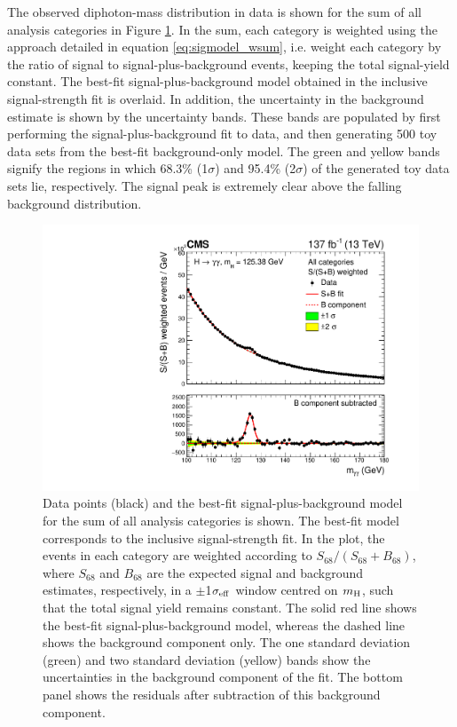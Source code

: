 The observed diphoton-mass distribution in data is shown for the sum of all analysis categories in Figure \ref{fig:sb_inclusive}. In the sum, each category is weighted using the approach detailed in equation \ref{eq:sigmodel_wsum}, i.e. weight each category by the ratio of signal to signal-plus-background events, keeping the total signal-yield constant. The best-fit signal-plus-background model obtained in the inclusive signal-strength fit is overlaid. In addition, the uncertainty in the background estimate is shown by the uncertainty bands. These bands are populated by first performing the signal-plus-background fit to data, and then generating 500 toy data sets from the best-fit background-only model. The green and yellow bands signify the regions in which 68.3\% (1$\sigma$) and 95.4\% (2$\sigma$) of the generated toy data sets lie, respectively. The signal peak is extremely clear above the falling background distribution.

\begin{figure}
  \centering
  \includegraphics[width=.6\textwidth]{Figures/hgg_results/sPlusBweighted.pdf}
  \caption[Observed diphoton mass distribution for the sum of all analysis categories]
  {
    Data points (black) and the best-fit signal-plus-background model for the sum of all analysis categories is shown. The best-fit model corresponds to the inclusive signal-strength fit. In the plot, the events in each category are weighted according to $S_{68}/(S_{68}+B_{68})$, where $S_{68}$ and $B_{68}$ are the expected signal and background estimates, respectively, in a $\pm$1$\sigma_{\rm{eff}}$ window centred on $m_{\rm{H}}$, such that the total signal yield remains constant. The solid red line shows the best-fit signal-plus-background model, whereas the dashed line shows the background component only. The one standard deviation (green) and two standard deviation (yellow) bands show the uncertainties in the background component of the fit. The bottom panel shows the residuals after subtraction of this background component.
  }
  \label{fig:sb_inclusive}
\end{figure}


